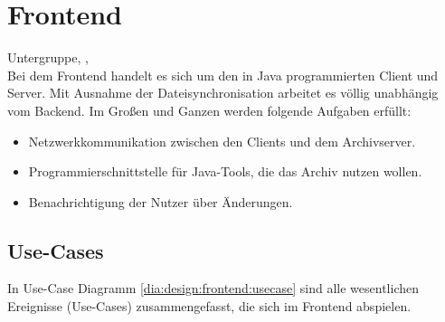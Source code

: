 \chapter{Frontend}
Untergruppe{\sab, \eddy, \cii} \\
Bei dem Frontend handelt es sich um den in Java programmierten Client und Server.
Mit Ausnahme der Dateisynchronisation arbeitet es völlig unabhängig vom Backend.
Im Großen und Ganzen werden folgende Aufgaben erfüllt:
\begin{itemize}
	\item Netzwerkkommunikation zwischen den Clients und dem Archivserver.
	\item Programmierschnittstelle für Java-Tools, die das Archiv nutzen wollen.
	\item Benachrichtigung der Nutzer über Änderungen.
\end{itemize}
\section{Use-Cases}
In Use-Case Diagramm \ref{dia:design:frontend:usecase} sind alle wesentlichen Ereignisse (Use-Cases) zusammengefasst, die sich im Frontend abspielen.
